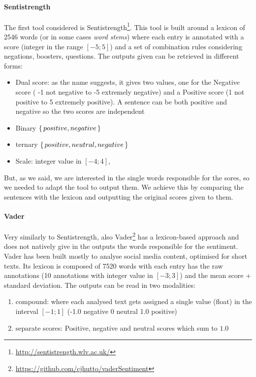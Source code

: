 \paragraph{Sentistrength}
The first tool considered is Sentistrength\footnote{\url{http://sentistrength.wlv.ac.uk/}}. This tool is built around a lexicon of 2546 words (or in some cases \emph{word stems}) where each entry is annotated with a score (integer in the range $[-5;5]$) and a set of combination rules considering negations, boosters, questions. The outputs given can be retrieved in different forms:
\begin{itemize}
    \item Dual score: as the name suggests, it gives two values, one for the Negative score ( -1 not negative to -5 extremely negative) and a Positive score (1 not positive to 5 extremely positive). A sentence can be both positive and negative so the two scores are independent
    \item Binary $\set{positive, negative}$
    \item ternary $\set{positive, neutral, negative}$
    \item Scale: integer value in $[-4;4]$,
\end{itemize}

But, as we said, we are interested in the single words responsible for the sores, so we needed to adapt the tool to output them. We achieve this by comparing the sentences with the lexicon and outputting the original scores given to them.


\paragraph{Vader}
Very similarly to Sentistrength, also Vader\footnote{\url{https://github.com/cjhutto/vaderSentiment}} has a lexicon-based approach and does not natively give in the outputs the words responsible for the sentiment. Vader has been built mostly to analyse social media content, optimised for short texts.
Its lexicon is composed of 7520 words with each entry has the raw annotations (10 annotations with integer value in $[-3;3]$) and the mean score + standard deviation.
The outputs can be read in two modalities:
\begin{enumerate}
    \item compound: where each analysed text gets assigned a single value (float) in the interval $[-1;1]$ (-1.0 negative 0 neutral 1.0 positive)
    \item separate scores: Positive, negative and neutral scores which sum to $1.0$
\end{enumerate}


